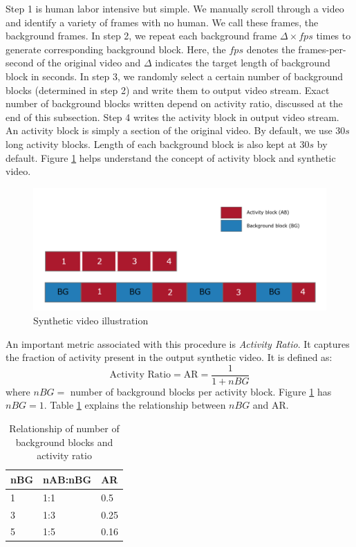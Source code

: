 Step 1 is human labor intensive but simple. We manually scroll through a video and identify a variety of frames with no human. We call these frames, the background frames. In step 2, we repeat each background frame $\Delta \times fps$ times to generate corresponding background block. Here, the $fps$ denotes the frames-per-second of the original video and $\Delta$ indicates the target length of background block in seconds. In step 3, we randomly select a certain number of  background blocks (determined in step 2) and write them to output video stream. Exact number of background blocks written depend on activity ratio, discussed at the end of this subsection. Step 4 writes the activity block in output video stream. An activity block is simply a section of the original video. By default, we use $30s$ long activity blocks. Length of each background block is also kept at $30s$ by default. Figure \ref{fig:synthetic-video} helps understand the concept of activity block and synthetic video.  

\begin{figure}
    \centering
    \includegraphics[width=\linewidth]{images/synthetic-video.PNG}
    \caption{Synthetic video illustration}
    \label{fig:synthetic-video}
\end{figure}

An important metric associated with this procedure is \textit{Activity Ratio}. It captures the fraction of activity present in the output synthetic video. It is defined as: 
$$ \text{Activity Ratio} = \text{AR} = \frac{1}{1+nBG} $$
where $nBG=$ number of background blocks per activity block. Figure \ref{fig:synthetic-video} has $nBG=1$. Table \ref{table:activity-ratio} explains the relationship between $nBG$ and AR. 


\begin{table}
\centering
\caption{Relationship of number of background blocks and activity ratio} \vspace{5pt}
\label{table:activity-ratio}
\begin{tabular}{@{}| l | l | l | @{}} \hline
nBG & nAB:nBG & AR   \\ \hline \hline
1   & 1:1     & 0.5  \\
3   & 1:3     & 0.25 \\
5   & 1:5     & 0.16 \\ \hline
\end{tabular}
\end{table}

